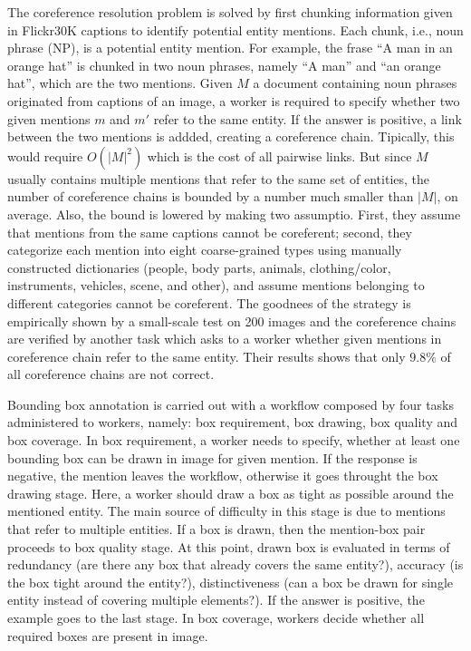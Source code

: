 The coreference resolution problem is solved by first chunking
information given in Flickr30K captions to identify potential entity
mentions. Each chunk, i.e., noun phrase (NP), is a potential entity
mention. For example, the frase ``A man in an orange hat'' is chunked
in two noun phrases, namely ``A man'' and ``an orange hat'', which are
the two mentions. Given $M$ a document containing noun phrases
originated from captions of an image, a worker is required to specify
whether two given mentions $m$ and $m'$ refer to the same entity. If
the answer is positive, a link between the two mentions is addded,
creating a coreference chain. Tipically, this would require $O(|M|^2)$
which is the cost of all pairwise links. But since $M$ usually
contains multiple mentions that refer to the same set of entities, the
number of coreference chains is bounded by a number much smaller than
$|M|$, on average. Also, the bound is lowered by making two assumptio.
First, they assume that mentions from the same captions cannot be
coreferent; second, they categorize each mention into eight
coarse-grained types using manually constructed dictionaries (people,
body parts, animals, clothing/color, instruments, vehicles, scene, and
other), and assume mentions belonging to different categories cannot
be coreferent. The goodnees of the strategy is empirically shown by a
small-scale test on 200 images and the coreference chains are verified
by another task which asks to a worker whether given mentions in
coreference chain refer to the same entity. Their results shows that
only $9.8\%$ of all coreference chains are not correct.

Bounding box annotation is carried out with a workflow composed by
four tasks administered to workers, namely: box requirement, box
drawing, box quality and box coverage. In box requirement, a worker
needs to specify, whether at least one bounding box can be drawn in
image for given mention. If the response is negative, the mention
leaves the workflow, otherwise it goes throught the box drawing stage.
Here, a worker should draw a box as tight as possible around the
mentioned entity. The main source of difficulty in this stage is due
to mentions that refer to multiple entities. If a box is drawn, then
the mention-box pair proceeds to box quality stage. At this point,
drawn box is evaluated in terms of redundancy (are there any box that
already covers the same entity?), accuracy (is the box tight around
the entity?), distinctiveness (can a box be drawn for single entity
instead of covering multiple elements?). If the answer is positive,
the example goes to the last stage. In box coverage, workers decide
whether all required boxes are present in image. 

